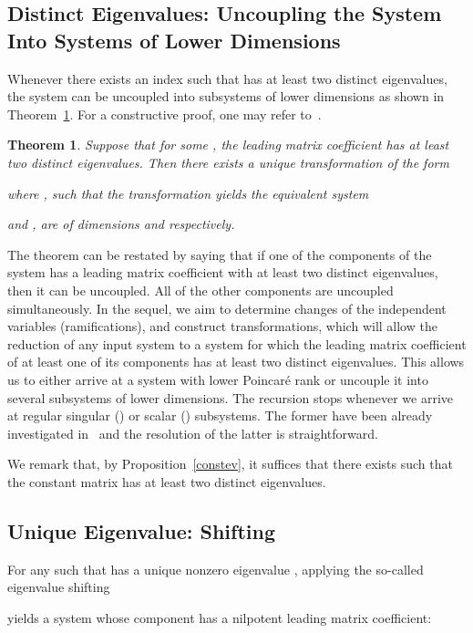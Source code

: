 \documentclass[final,1p,times,number,amsthm]{elsart}
\newtheorem{theorem}[lemma]{Theorem}
\begin{document}
\subsection{Distinct Eigenvalues: Uncoupling the System Into Systems 
of Lower Dimensions}
\label{diagpfaff}
Whenever there exists an index  such that  has at
least two distinct eigenvalues, the system can be uncoupled into subsystems of
lower dimensions as shown in Theorem~\ref{blockpfaff}. For a constructive proof,
one may refer to~\cite[Section 5.2, pp 233]{key1}.
\begin{theorem}\label{blockpfaff}
  Suppose that for some , the leading matrix coefficient
   has at least two distinct eigenvalues. Then there exists a unique
  transformation  of the form
  
where , such that the transformation  yields
  the equivalent system
  
  and , 
  are of dimensions  and  respectively. 
\end{theorem}
The theorem can be restated by saying that if one of the components of the
system has a leading matrix coefficient with at least two distinct eigenvalues,
then it can be uncoupled. All of the other components are uncoupled
simultaneously. In the sequel, we aim to determine changes of the independent
variables  (ramifications), and construct transformations, which will allow
the reduction of any input system to a system for which the leading matrix
coefficient of at least one of its components has at least two distinct
eigenvalues. This allows us to either arrive at a system with lower Poincar\'e
rank or uncouple it into several subsystems of lower dimensions. The
recursion stops whenever we arrive at regular singular () or scalar
() subsystems. The former have been already investigated in~\cite[Chapter
3]{key73} and the resolution of the latter is straightforward.

We remark that, by Proposition~\ref{constev}, it suffices that there exists
 such that the constant matrix
 has at least two distinct
eigenvalues.

\subsection{Unique Eigenvalue: Shifting}
\label{shiftpfaff}
For any  such that  has a unique nonzero
eigenvalue , applying the so-called eigenvalue
shifting

yields a system  whose  component has a nilpotent leading
matrix coefficient:
\end{document}

